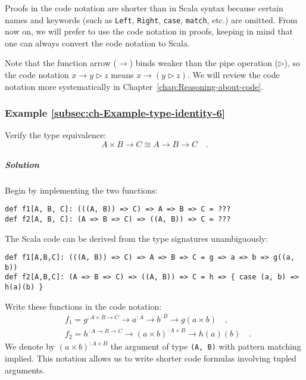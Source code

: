 Proofs in the code notation are shorter than in Scala syntax because
certain names and keywords (such as \lstinline!Left!, \lstinline!Right!,
\lstinline!case!, \lstinline!match!, etc.) are omitted. From now
on, we will prefer to use the code notation in proofs, keeping in
mind that one can always convert the code notation to Scala.

Note that the function arrow ($\rightarrow$) binds weaker than the
pipe operation ($\triangleright$), so the code notation $x\rightarrow y\triangleright z$
means $x\rightarrow(y\triangleright z)$. We will review the code
notation more systematically in Chapter~\ref{chap:Reasoning-about-code}.

\subsubsection{Example \label{subsec:ch-Example-type-identity-6}\ref{subsec:ch-Example-type-identity-6}}

Verify the type equivalence:
\[
A\times B\rightarrow C\cong A\rightarrow B\rightarrow C\quad.
\]


\subparagraph{Solution}

Begin by implementing the two functions:
\begin{lstlisting}
def f1[A, B, C]: (((A, B)) => C) => A => B => C = ???
def f2[A, B, C]: (A => B => C) => ((A, B)) => C = ???
\end{lstlisting}
The Scala code can be derived from the type signatures unambiguously:
\begin{lstlisting}
def f1[A,B,C]: (((A, B)) => C) => A => B => C = g => a => b => g((a, b))
def f2[A,B,C]: (A => B => C) => ((A, B)) => C = h => { case (a, b) => h(a)(b) }
\end{lstlisting}
Write these functions in the code notation:
\begin{align*}
 & f_{1}=g^{:A\times B\rightarrow C}\rightarrow a^{:A}\rightarrow b^{:B}\rightarrow g(a\times b)\quad,\\
 & f_{2}=h^{:A\rightarrow B\rightarrow C}\rightarrow\left(a\times b\right)^{:A\times B}\rightarrow h(a)(b)\quad.
\end{align*}
We denote by $\left(a\times b\right)^{:A\times B}$ the argument of
type \lstinline!(A, B)! with pattern matching implied. This notation
allows us to write shorter code formulas involving tupled arguments.

